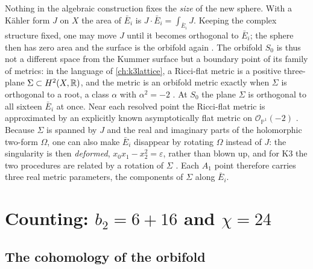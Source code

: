 \begin{physicsbox}
Nothing in the algebraic construction fixes the \emph{size} of the new sphere. With a Kähler
form $J$ on $X$ the area of $\bar E_i$ is $J\cdot\bar E_i=\int_{\bar E_i}J$. Keeping the
complex structure fixed, one may move $J$ until it becomes orthogonal to $\bar E_i$; the
sphere then has zero area and the surface is the orbifold again . The orbifold $S_0$ is thus not a different space from the Kummer surface
but a boundary point of its family of metrics: in the language of \cref{ch:k3lattice}, a
Ricci-flat metric is a positive three-plane $\Sigma\subset H^2(X,\mathbb{R})$, and the metric is an
orbifold metric exactly when $\Sigma$ is orthogonal to a root, a class $\alpha$ with
$\alpha^2=-2$ \TL{} . At $S_0$ the plane $\Sigma$ is
orthogonal to all sixteen $\bar E_i$ at once. Near each resolved point the Ricci-flat metric
is approximated by an explicitly known asymptotically flat metric on
$\mathcal{O}_{\mathbb{P}^1}(-2)$ . Because $\Sigma$ is spanned by
$J$ and the real and imaginary parts of the holomorphic two-form $\Omega$, one can also make
$\bar E_i$ disappear by rotating $\Omega$ instead of $J$: the singularity is then
\emph{deformed}, $x_0x_1-x_2^2=\varepsilon$, rather than blown up, and for K3 the two
procedures are related by a rotation of $\Sigma$ . Each
$A_1$ point therefore carries three real metric parameters, the components of $\Sigma$ along
$\bar E_i$.
\end{physicsbox}

\section{Counting: \texorpdfstring{$b_2=6+16$ and $\chi=24$}{b2 = 6+16 and chi = 24}}
\label{sec:kummer:count}

\subsection{The cohomology of the orbifold}


